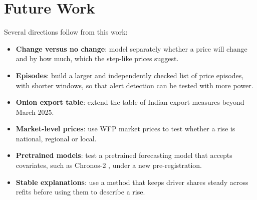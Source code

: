 \documentclass[12pt]{report}
\begin{document}
\section{Future Work}
Several directions follow from this work:
\begin{itemize}
    \item \textbf{Change versus no change}: model separately whether a price will change and by how much, which the step-like prices suggest.
    \item \textbf{Episodes}: build a larger and independently checked list of price episodes, with shorter windows, so that alert detection can be tested with more power.
    \item \textbf{Onion export table}: extend the table of Indian export measures beyond March 2025.
    \item \textbf{Market-level prices}: use WFP market prices to test whether a rise is national, regional or local.
    \item \textbf{Pretrained models}: test a pretrained forecasting model that accepts covariates, such as Chronos-2 \cite{chronos2}, under a new pre-registration.
    \item \textbf{Stable explanations}: use a method that keeps driver shares steady across refits before using them to describe a rise.
\end{itemize}

\begingroup
\let\clearpage\relax
\renewcommand{\bibname}{REFERENCES}
\printbibliography
\endgroup
\end{document}
